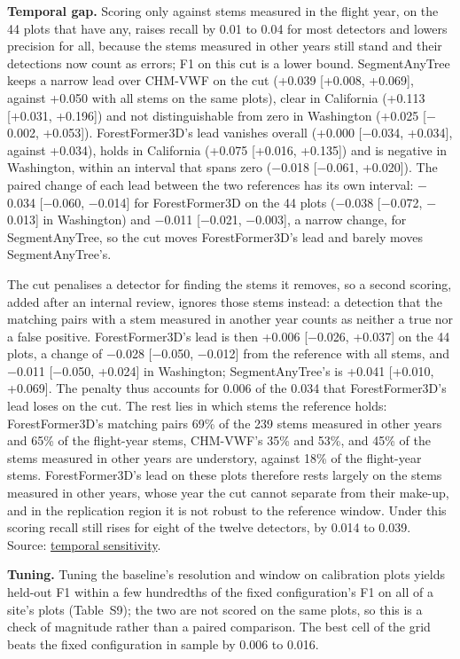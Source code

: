 \documentclass[10pt]{article}
\begin{document}
\textbf{Temporal gap.} Scoring only against stems measured in the flight year, on the
44 plots that have any, raises recall by 0.01 to 0.04 for most detectors and
lowers precision for all, because the stems measured in other years still stand
and their detections now count as errors; F1 on this cut is a lower bound.
SegmentAnyTree keeps a narrow lead over CHM-VWF on the cut (+0.039 [+0.008,
+0.069], against +0.050 with all stems on the same plots), clear in California
(+0.113 [+0.031, +0.196]) and not distinguishable from zero in Washington
(+0.025 [$-$0.002, +0.053]). ForestFormer3D's lead vanishes overall (+0.000
[$-$0.034, +0.034], against +0.034), holds in California (+0.075 [+0.016, +0.135])
and is negative in Washington, within an interval that spans zero ($-$0.018
[$-$0.061, +0.020]). The paired change of each lead between the two references has
its own interval: $-$0.034 [$-$0.060, $-$0.014] for ForestFormer3D on the 44 plots
($-$0.038 [$-$0.072, $-$0.013] in Washington) and $-$0.011 [$-$0.021, $-$0.003], a narrow
change, for SegmentAnyTree, so the cut moves ForestFormer3D's lead and barely
moves SegmentAnyTree's.

The cut penalises a detector for finding the stems it removes, so a second
scoring, added after an internal review, ignores those stems instead: a
detection that the matching pairs with a stem measured in another year counts as
neither a true nor a false positive. ForestFormer3D's lead is then +0.006
[$-$0.026, +0.037] on the 44 plots, a change of $-$0.028 [$-$0.050, $-$0.012] from the
reference with all stems, and $-$0.011 [$-$0.050, +0.024] in Washington;
SegmentAnyTree's is +0.041 [+0.010, +0.069]. The penalty thus accounts for 0.006
of the 0.034 that ForestFormer3D's lead loses on the cut. The rest lies in which
stems the reference holds: ForestFormer3D's matching pairs 69\% of the 239 stems
measured in other years and 65\% of the flight-year stems, CHM-VWF's 35\% and 53\%,
and 45\% of the stems measured in other years are understory, against 18\% of the
flight-year stems. ForestFormer3D's lead on these plots therefore rests largely
on the stems measured in other years, whose year the cut cannot separate from
their make-up, and in the replication region it is not robust to the reference
window. Under this scoring recall still rises for eight of the twelve detectors,
by 0.014 to 0.039. Source: \href{https://github.com/devakellc/lidar-tree-benchmark/blob/main/results/temporal-sensitivity-results.md}{temporal
sensitivity}.

\textbf{Tuning.} Tuning the baseline's resolution and window on calibration plots
yields held-out F1 within a few hundredths of the fixed configuration's F1 on
all of a site's plots (Table~S9); the two are not scored on the same plots, so
this is a check of magnitude rather than a paired comparison. The best cell of
the grid beats the fixed configuration in sample by 0.006 to 0.016.
\end{document}
